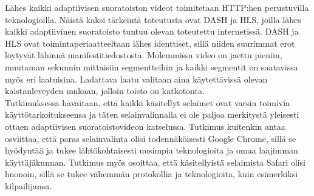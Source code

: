 \documentclass[finnish, 12pt, a4paper, elec, utf8, a-1b, online]{aaltothesis}
\begin{document}
\noindent Lähes kaikki adaptiivisen suoratoiston videot toimitetaan HTTP:hen perustuvilla teknologioilla. Näistä kaksi tärkeintä toteutusta ovat DASH ja HLS, joilla lähes kaikki adaptiivinen suoratoisto tuntuu olevan toteutettu internetissä. DASH ja HLS ovat toimintaperiaatteeltaan lähes identtiset, sillä niiden suurimmat erot löytyvät lähinnä manifestitiedostosta. Molemmissa video on jaettu pieniin, muutaman sekunnin mittaisiin segmentteihin ja kaikki segmentit on saatavissa myös eri laatuisina. Ladattava laatu valitaan aina käytettävissä olevan kaistanleveyden mukaan, jolloin toisto on katkotonta. \\

\noindent Tutkimuksessa havaitaan, että kaikki käsitellyt selaimet ovat varsin toimivia käyttötarkoitukseensa ja täten selainvalinnalla ei ole paljoa merkitystä yleisesti ottaen adaptiivisen suoratoistovideon katselussa. Tutkimus kuitenkin antaa osviittaa, että paras selainvalinta olisi todennäköisesti Google Chrome, sillä se hyödyntää ja tukee lähtökohtaisesti uusimpia teknologioita ja omaa laajimman käyttäjäkunnan. Tutkimus myös osoittaa, että käsitellyistä selaimista Safari olisi huonoin, sillä se tukee vähemmän protokollia ja teknologioita, kuin esimerkiksi kilpailijansa.

\clearpage
\end{document}
